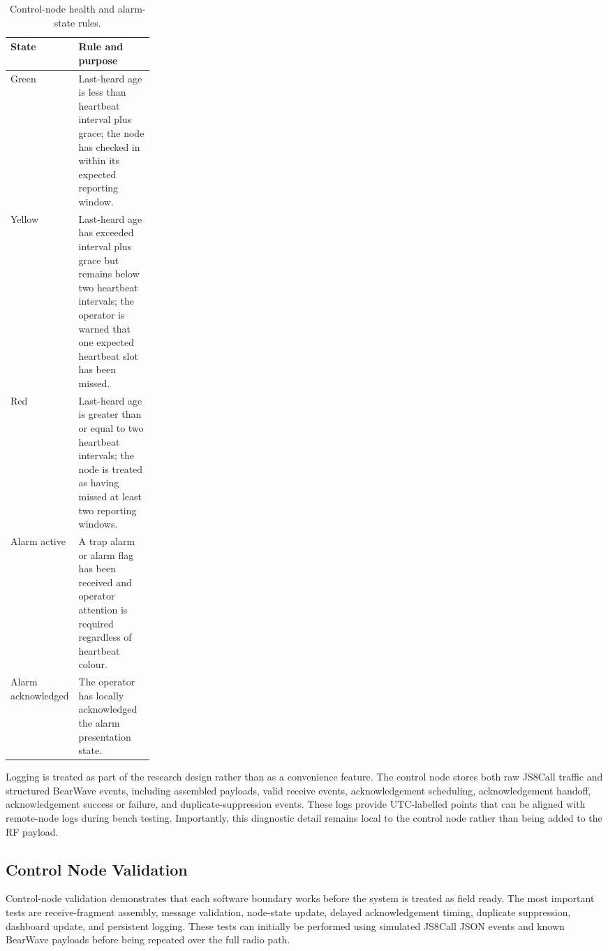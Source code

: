 \documentclass[acmsmall,screen]{acmart}
\begin{document}
\begin{table}[tbp]
\caption{Control-node health and alarm-state rules.}
\label{tab:control-node-health-rules}
\begin{tabularx}{\linewidth}{p{0.24\linewidth}X}
\toprule
State & Rule and purpose \\
\midrule
Green & Last-heard age is less than heartbeat interval plus grace; the node has checked in within its expected reporting window. \\
Yellow & Last-heard age has exceeded interval plus grace but remains below two heartbeat intervals; the operator is warned that one expected heartbeat slot has been missed. \\
Red & Last-heard age is greater than or equal to two heartbeat intervals; the node is treated as having missed at least two reporting windows. \\
Alarm active & A trap alarm or alarm flag has been received and operator attention is required regardless of heartbeat colour. \\
Alarm acknowledged & The operator has locally acknowledged the alarm presentation state. \\
\bottomrule
\end{tabularx}
\end{table}

Logging is treated as part of the research design rather than as a convenience feature. The control node stores both raw JS8Call traffic and structured BearWave events, including assembled payloads, valid receive events, acknowledgement scheduling, acknowledgement handoff, acknowledgement success or failure, and duplicate-suppression events. These logs provide UTC-labelled points that can be aligned with remote-node logs during bench testing. Importantly, this diagnostic detail remains local to the control node rather than being added to the RF payload.

\subsection{Control Node Validation}
Control-node validation demonstrates that each software boundary works before the system is treated as field ready. The most important tests are receive-fragment assembly, message validation, node-state update, delayed acknowledgement timing, duplicate suppression, dashboard update, and persistent logging. These tests can initially be performed using simulated JS8Call JSON events and known BearWave payloads before being repeated over the full radio path.
\end{document}
